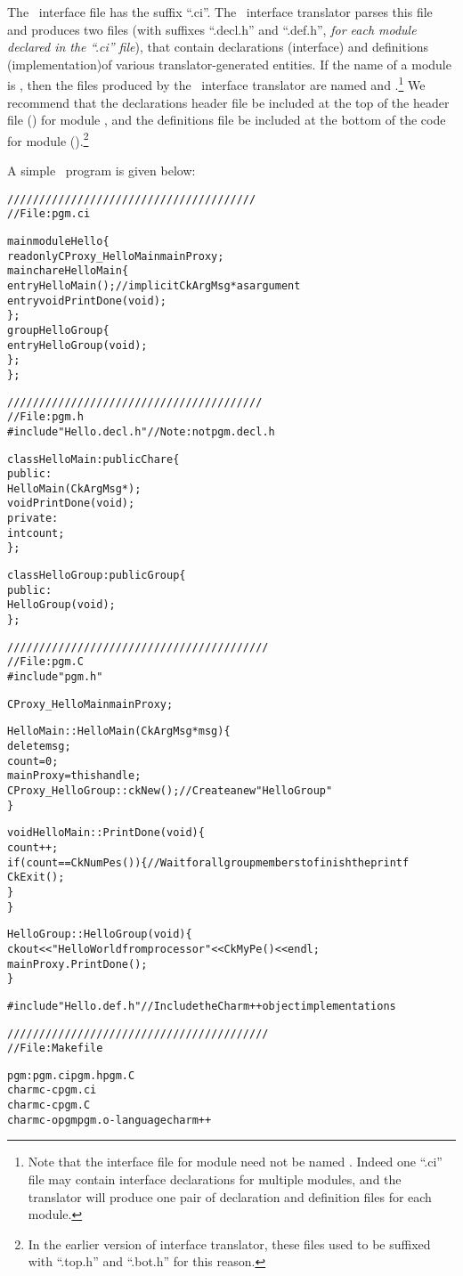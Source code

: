 The \charmpp\ interface file has the suffix ``.ci''.  The \charmpp\ interface
translator parses this file and produces two files (with suffixes ``.decl.h''
and ``.def.h'', {\em for each module declared in the ``.ci'' file}), that
contain declarations (interface) and definitions (implementation)of various
translator-generated entities. If the name of a module is , then the
files produced by the \charmpp\ interface translator are named 
and .\footnote{Note that the interface file for module 
need not be named . Indeed one ``.ci'' file may contain interface
declarations for multiple modules, and the translator will produce one pair of
declaration and definition files for each module.}  We recommend that the
declarations header file be included at the top of the header file ()
for module , and the definitions file be included at the bottom of the
code for module ().\footnote{In the earlier version of interface
translator, these files used to be suffixed with ``.top.h'' and ``.bot.h'' for
this reason.}

A simple \charmpp\ program is given below:

\begin{alltt}
///////////////////////////////////////
// File: pgm.ci

mainmodule Hello \{
  readonly CProxy_HelloMain mainProxy;
  mainchare HelloMain \{
    entry HelloMain(); // implicit CkArgMsg * as argument
    entry void PrintDone(void);
  \};
  group HelloGroup \{
    entry HelloGroup(void);
  \};
\};

////////////////////////////////////////
// File: pgm.h
#include "Hello.decl.h" // Note: not pgm.decl.h

class HelloMain: public Chare \{
  public:
    HelloMain(CkArgMsg *);
    void PrintDone(void);
  private:
    int count;
\};

class HelloGroup: public Group \{
  public:
    HelloGroup(void);
\};

/////////////////////////////////////////
// File: pgm.C
#include "pgm.h"

CProxy_HelloMain mainProxy;

HelloMain::HelloMain(CkArgMsg *msg) \{
  delete msg;
  count = 0;
  mainProxy=thishandle;
  CProxy_HelloGroup::ckNew(); // Create a new "HelloGroup"
\}

void HelloMain::PrintDone(void) \{
  count++;
  if (count == CkNumPes()) \{ // Wait for all group members to finish the printf
    CkExit();
  \}
\}

HelloGroup::HelloGroup(void) \{
  ckout << "Hello World from processor " << CkMyPe() << endl;
  mainProxy.PrintDone();
\}

#include "Hello.def.h" // Include the Charm++ object implementations

/////////////////////////////////////////
// File: Makefile

pgm: pgm.ci pgm.h pgm.C
      charmc -c pgm.ci
      charmc -c pgm.C
      charmc -o pgm pgm.o -language charm++

\end{alltt}

